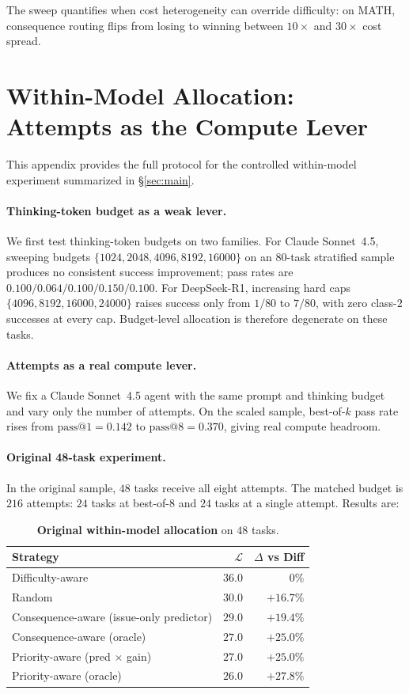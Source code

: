 \documentclass{article}
\begin{document}
The sweep quantifies when cost heterogeneity can override difficulty:
on MATH, consequence routing flips from losing to winning between
$10\times$ and $30\times$ cost spread.

\section{Within-Model Allocation: Attempts as the Compute Lever}
\label{app:within}

This appendix provides the full protocol for the controlled
within-model experiment summarized in \S\ref{sec:main}.

\paragraph{Thinking-token budget as a weak lever.}
We first test thinking-token budgets on two families. For Claude
Sonnet~4.5, sweeping budgets
$\{1024,2048,4096,8192,16000\}$ on an $80$-task stratified sample
produces no consistent success improvement; pass rates are
$0.100/0.064/0.100/0.150/0.100$. For DeepSeek-R1, increasing hard caps
$\{4096,8192,16000,24000\}$ raises success only from $1/80$ to
$7/80$, with zero class-$2$ successes at every cap. Budget-level
allocation is therefore degenerate on these tasks.

\paragraph{Attempts as a real compute lever.}
We fix a Claude Sonnet~4.5 agent with the same prompt and thinking
budget and vary only the number of attempts. On the scaled sample,
best-of-$k$ pass rate rises from $\mathrm{pass@}1=0.142$ to
$\mathrm{pass@}8=0.370$, giving real compute headroom.

\paragraph{Original 48-task experiment.}
In the original sample, $48$ tasks receive all eight attempts. The
matched budget is $216$ attempts: $24$ tasks at best-of-$8$ and
$24$ tasks at a single attempt. Results are:

\begin{table}[h]
\centering
\caption{\textbf{Original within-model allocation} on $48$ tasks.}
\label{tab:within}
\small
\begin{tabular}{lrr}
\toprule
Strategy & $\mathcal{L}$ & $\Delta$ vs Diff \\
\midrule
Difficulty-aware & $36.0$ & $0\%$ \\
Random & $30.0$ & $+16.7\%$ \\
Consequence-aware (issue-only predictor) & $29.0$ & $+19.4\%$ \\
Consequence-aware (oracle) & $27.0$ & $+25.0\%$ \\
Priority-aware (pred $\times$ gain) & $27.0$ & $+25.0\%$ \\
Priority-aware (oracle) & $\mathbf{26.0}$ & $\mathbf{+27.8\%}$ \\
\bottomrule
\end{tabular}
\end{table}
\end{document}

